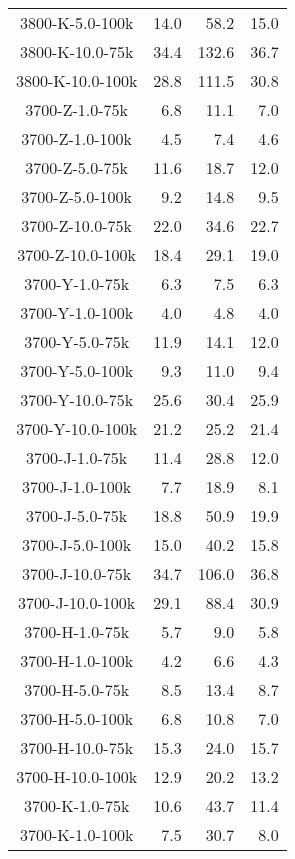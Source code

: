 \begin{longtable}{crrr}
    3800-K-5.0-100k  &   14.0 &   58.2 &   15.0 \\
    3800-K-10.0-75k  &   34.4 &  132.6 &   36.7 \\
    3800-K-10.0-100k &   28.8 &  111.5 &   30.8 \\
    3700-Z-1.0-75k   &    6.8 &   11.1 &    7.0 \\
    3700-Z-1.0-100k  &    4.5 &    7.4 &    4.6 \\
    3700-Z-5.0-75k   &   11.6 &   18.7 &   12.0 \\
    3700-Z-5.0-100k  &    9.2 &   14.8 &    9.5 \\
    3700-Z-10.0-75k  &   22.0 &   34.6 &   22.7 \\
    3700-Z-10.0-100k &   18.4 &   29.1 &   19.0 \\
    3700-Y-1.0-75k   &    6.3 &    7.5 &    6.3 \\
    3700-Y-1.0-100k  &    4.0 &    4.8 &    4.0 \\
    3700-Y-5.0-75k   &   11.9 &   14.1 &   12.0 \\
    3700-Y-5.0-100k  &    9.3 &   11.0 &    9.4 \\
    3700-Y-10.0-75k  &   25.6 &   30.4 &   25.9 \\
    3700-Y-10.0-100k &   21.2 &   25.2 &   21.4 \\
    3700-J-1.0-75k   &   11.4 &   28.8 &   12.0 \\
    3700-J-1.0-100k  &    7.7 &   18.9 &    8.1 \\
    3700-J-5.0-75k   &   18.8 &   50.9 &   19.9 \\
    3700-J-5.0-100k  &   15.0 &   40.2 &   15.8 \\
    3700-J-10.0-75k  &   34.7 &  106.0 &   36.8 \\
    3700-J-10.0-100k &   29.1 &   88.4 &   30.9 \\
    3700-H-1.0-75k   &    5.7 &    9.0 &    5.8 \\
    3700-H-1.0-100k  &    4.2 &    6.6 &    4.3 \\
    3700-H-5.0-75k   &    8.5 &   13.4 &    8.7 \\
    3700-H-5.0-100k  &    6.8 &   10.8 &    7.0 \\
    3700-H-10.0-75k  &   15.3 &   24.0 &   15.7 \\
    3700-H-10.0-100k &   12.9 &   20.2 &   13.2 \\
    3700-K-1.0-75k   &   10.6 &   43.7 &   11.4 \\
    3700-K-1.0-100k  &    7.5 &   30.7 &    8.0 \\

\end{longtable}
